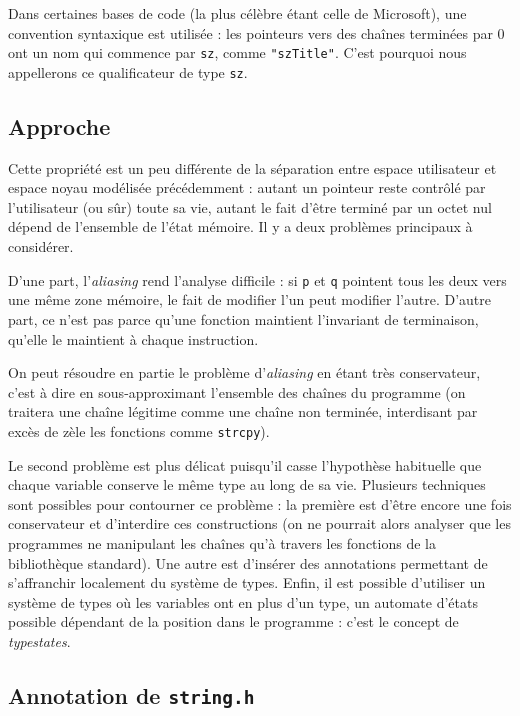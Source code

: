 Dans certaines bases de code (la plus célèbre étant celle de Microsoft), une
convention syntaxique est utilisée : les pointeurs vers des chaînes terminées
par 0 ont un nom qui commence par \texttt{sz}, comme \texttt{"szTitle"}. C'est
pourquoi nous appellerons ce qualificateur de type \texttt{sz}.

\subsection{Approche}

Cette propriété est un peu différente de la séparation entre espace utilisateur
et espace noyau modélisée précédemment : autant un pointeur reste contrôlé par
l'utilisateur (ou sûr) toute sa vie, autant le fait d'être terminé par un octet
nul dépend de l'ensemble de l'état mémoire. Il y a deux problèmes principaux à
considérer.

D'une part, l'\emph{aliasing} rend l'analyse difficile : si \texttt{p} et
\texttt{q} pointent tous les deux vers une même zone mémoire, le fait de
modifier l'un peut modifier l'autre. D'autre part, ce n'est pas parce qu'une
fonction maintient l'invariant de terminaison, qu'elle le maintient à chaque
instruction.

On peut résoudre en partie le problème d'\emph{aliasing} en étant très
conservateur, c'est à dire en sous-approximant l'ensemble des chaînes du
programme (on traitera une chaîne légitime comme une chaîne non terminée,
interdisant par excès de zèle les fonctions comme \texttt{strcpy}).

Le second problème est plus délicat puisqu'il casse l'hypothèse habituelle que
chaque variable conserve le même type au long de sa vie. Plusieurs techniques
sont possibles pour contourner ce problème : la première est d'être encore une
fois conservateur et d'interdire ces constructions (on ne pourrait alors
analyser que les programmes ne manipulant les chaînes qu'à travers les fonctions
de la bibliothèque standard). Une autre est d'insérer des annotations permettant
de s'affranchir localement du système de types. Enfin, il est possible
d'utiliser un système de types où les variables ont en plus d'un type, un
automate d'états possible dépendant de la position dans le programme : c'est le
concept de \emph{typestates}\cite{tse12-typestate}.

\subsection{Annotation de \texttt{string.h}}


